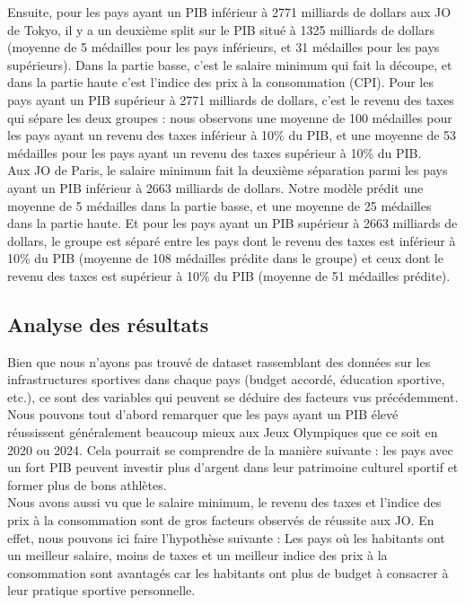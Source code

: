 \documentclass{article}
\begin{document}
Ensuite, pour les pays ayant un PIB inférieur à 2771 milliards de dollars aux JO de Tokyo, il y a un deuxième split sur le PIB situé à 1325 milliards de dollars (moyenne de 5 médailles pour les pays inférieurs, et 31 médailles pour les pays supérieurs). Dans la partie basse, c'est le salaire minimum qui fait la découpe, et dans la partie haute c'est l'indice des prix à la consommation (CPI). Pour les pays ayant un PIB supérieur à 2771 milliards de dollars, c'est le revenu des taxes qui sépare les deux groupes : nous observons une moyenne de 100 médailles pour les pays ayant un revenu des taxes inférieur à 10\% du PIB, et une moyenne de 53 médailles pour les pays ayant un revenu des taxes supérieur à 10\% du PIB.
\\

Aux JO de Paris, le salaire minimum fait la deuxième séparation parmi les pays ayant un PIB inférieur à 2663 milliards de dollars. Notre modèle prédit une moyenne de 5 médailles dans la partie basse, et une moyenne de 25 médailles dans la partie haute. Et pour les pays ayant un PIB supérieur à 2663 milliards de dollars, le groupe est séparé entre les pays dont le revenu des taxes est inférieur à 10\% du PIB (moyenne de 108 médailles prédite dans le groupe) et ceux dont le revenu des taxes est supérieur à 10\% du PIB (moyenne de 51 médailles prédite).

\subsection{Analyse des résultats}

Bien que nous n'ayons pas trouvé de dataset rassemblant des données sur les infrastructures sportives dans chaque pays (budget accordé, éducation sportive, etc.), ce sont des variables qui peuvent se déduire des facteurs vus précédemment.
\\

Nous pouvons tout d'abord remarquer que les pays ayant un PIB élevé réussissent généralement beaucoup mieux aux Jeux Olympiques que ce soit en 2020 ou 2024. Cela pourrait se comprendre de la manière suivante : les pays avec un fort PIB peuvent investir plus d'argent dans leur patrimoine culturel sportif et former plus de bons athlètes.
\\

Nous avons aussi vu que le salaire minimum, le revenu des taxes et l'indice des prix à la consommation sont de gros facteurs observés de réussite aux JO. En effet, nous pouvons ici faire l'hypothèse suivante : Les pays où les habitants ont un meilleur salaire, moins de taxes et un meilleur indice des prix à la consommation sont avantagés car les habitants ont plus de budget à consacrer à leur pratique sportive personnelle.
\\
\end{document}
